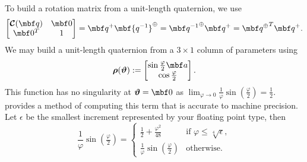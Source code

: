 \documentclass[11pt,a4,oneside]{article}
\begin{document}
To build a rotation matrix from a unit-length quaternion, we use
\begin{equation}
  \label{eq:quat2r}
  \bbm \mbc C(\mbf q) & \mbf 0 \\
       \mbf 0^T       &   1 \ebm
 = \mbf q^{+}\mbf {q^{-1}}^{\oplus} = {\mbf q^{-1}}^{\oplus}\mbf q^{+} = {\mbf q^\oplus}^T \mbf q^{+}.
\end{equation}
We may build a unit-length quaternion from a $3\times 1$ column of parameters using
\begin{equation}
  \label{eq:quat-build}
  \mbs \rho(\mbs \vartheta) := 
    \bbm 
      \sin\tfrac{\varphi}{2} \mbf a \\
      \cos\tfrac{\varphi}{2}
    \ebm.  
\end{equation}
This function has no singularity at $\mbs \vartheta = \mbf 0$ as ${\displaystyle \lim_{\varphi\rightarrow 0}} \frac{1}{\varphi}\sin\left( \tfrac{\varphi}{2} \right) = \tfrac{1}{2}$. \citet{Grassia9800} provides a method of computing this term that is accurate to machine precision. Let $\epsilon$ be the smallest increment represented by your floating point type, then
\begin{equation}
  \frac{1}{\varphi}\sin\left( \tfrac{\varphi}{2} \right) = 
    \begin{cases}
       \tfrac{1}{2} + \tfrac{\varphi^2}{48}    & \text{if $\varphi \le \sqrt[4]{\epsilon}$},\\
       \frac{1}{\varphi}\sin\left(\tfrac{\varphi}{2}\right) & \text{otherwise}.
    \end{cases}
\end{equation}
\end{document}
